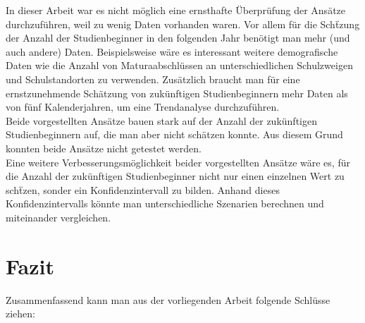 In dieser Arbeit war es nicht m\"oglich eine ernsthafte \"Uberpr\"ufung der Ans\"atze durchzuf\"uhren, weil zu wenig Daten vorhanden waren. 
Vor allem f\"ur die Sch\"tzung der Anzahl der Studienbeginner in den folgenden Jahr ben\"otigt man mehr (und auch andere) Daten. Beispielsweise 
w\"are es interessant weitere demografische Daten wie die Anzahl von Maturaabschl\"ussen an unterschiedlichen Schulzweigen und Schulstandorten zu verwenden. 
Zus\"atzlich braucht man f\"ur eine ernstzunehmende Sch\"atzung von zuk\"unftigen Studienbeginnern mehr Daten als von f\"unf Kalenderjahren, um eine Trendanalyse 
durchzuf\"uhren. \\

Beide vorgestellten Ans\"atze bauen stark auf der Anzahl der zuk\"unftigen Studienbeginnern auf, die man aber nicht sch\"atzen konnte. Aus diesem Grund konnten 
beide Ans\"atze nicht getestet werden. \\

Eine weitere Verbesserungsm\"oglichkeit beider vorgestellten Ans\"atze w\"are es, f\"ur die Anzahl der zuk\"unftigen Studienbeginner nicht nur einen einzelnen Wert 
zu sch\"tzen, sonder ein Konfidenzintervall zu bilden. Anhand dieses Konfidenzintervalls k\"onnte man unterschiedliche Szenarien berechnen und miteinander vergleichen. 







\section{Fazit}

Zusammenfassend kann man aus der vorliegenden Arbeit folgende Schl\"usse ziehen:

